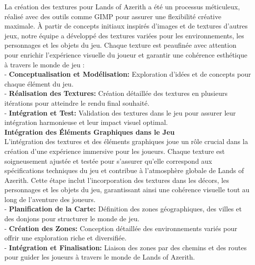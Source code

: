 La création des textures pour Lands of Azerith a été un processus méticuleux, réalisé avec des outils comme GIMP pour assurer une flexibilité créative maximale. À partir de concepts initiaux inspirés d'images et de textures d'autres jeux, notre équipe a développé des textures variées pour les environnements, les personnages et les objets du jeu. Chaque texture est peaufinée avec attention pour enrichir l'expérience visuelle du joueur et garantir une cohérence esthétique à travers le monde de jeu : 
\\

- \textbf{Conceptualisation et Modélisation:} Exploration d'idées et de concepts pour chaque élément du jeu.
\\

- \textbf{Réalisation des Textures:} Création détaillée des textures en plusieurs itérations pour atteindre le rendu final souhaité.
\\

- \textbf{Intégration et Test:} Validation des textures dans le jeu pour assurer leur intégration harmonieuse et leur impact visuel optimal.
\\


\textbf{Intégration des Éléments Graphiques dans le Jeu}
\\

L'intégration des textures et des éléments graphiques joue un rôle crucial dans la création d'une expérience immersive pour les joueurs. Chaque texture est soigneusement ajustée et testée pour s'assurer qu'elle correspond aux spécifications techniques du jeu et contribue à l'atmosphère globale de Lands of Azerith. Cette étape inclut l'incorporation des textures dans les décors, les personnages et les objets du jeu, garantissant ainsi une cohérence visuelle tout au long de l'aventure des joueurs. 
\\

- \textbf{Planification de la Carte:} Définition des zones géographiques, des villes et des donjons pour structurer le monde de jeu.
\\

- \textbf{Création des Zones:} Conception détaillée des environnements variés pour offrir une exploration riche et diversifiée.
\\

- \textbf{Intégration et Finalisation:} Liaison des zones par des chemins et des routes pour guider les joueurs à travers le monde de Lands of Azerith.
\\


